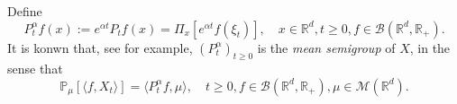\documentclass[12pt,a4paper]{amsart}
\theoremstyle{plain}
\theoremstyle{definition}
\numberwithin{equation}{section}
\begin{document}
	Define
\begin{equation}
\label{eq: meansemigroup}
    P^{\alpha}_t f(x)
    :=
    e^{\alpha t} P_t f(x) =
    \Pi_x [e^{\alpha t}f(\xi_t)],
    \quad x\in \mathbb R^d,t\geq 0, f\in \mathcal B(\mathbb R^d, \mathbb R_+).
\end{equation}
    It is konwn that, see \cite[Proposition 2.27]{Li2011Measure-valued} for example, $(P^\alpha_t)_{t\geq 0}$ is the \emph{mean semigroup} of $X$, in the sense that
\begin{equation}
    \mathbb{P}_{\mu}[\langle f, X_t \rangle]
    = \langle P^\alpha_t f, \mu \rangle,
    \quad t\geq 0, f\in \mathcal B(\mathbb R^d, \mathbb R_+), \mu \in \mathcal M(\mathbb R^d).
\end{equation}
\end{document}
